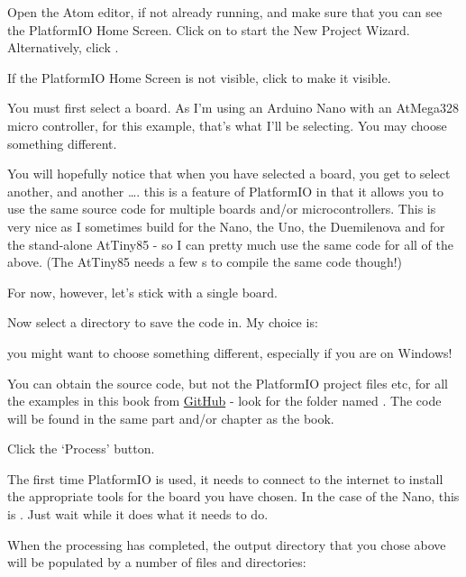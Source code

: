 Open the Atom editor, if not already running, and make sure that you can see the PlatformIO Home Screen. Click on  to start the New Project Wizard. Alternatively, click .

If the PlatformIO Home Screen is not visible, click  to make it visible.

You must first select a board. As I'm using an Arduino Nano with an AtMega328 micro controller, for this example, that's what I'll be selecting. You may choose something different.

You will hopefully notice that when you have selected a board, you get to select another, and another \ldots{}. this is a feature of PlatformIO in that it allows you to use the same source code for multiple boards and/or microcontrollers. This is very nice as I sometimes build for the Nano, the Uno, the Duemilenova and for the stand-alone AtTiny85 - so I can pretty much use the same code for all of the above. (The AtTiny85 needs a few s to compile the same code though!)

For now, however, let's stick with a single board.

Now select a directory to save the code in. My choice is:


you might want to choose something different, especially if you are on
Windows!

\begin{note}
You can obtain the source code, but not the PlatformIO project files etc, for all the examples in this book from \href{https://github.com/NormanDunbar/AVRBook}{GitHub} - look for the folder named . The code will be found in the same part and/or chapter as the book.
\end{note}

Click the `Process' button.

The first time PlatformIO is used, it needs to connect to the internet
to install the appropriate tools for the board you have chosen. In the
case of the Nano, this is . Just wait while it does what it needs to do.

When the processing has completed, the output directory that you chose
above will be populated by a number of files and directories:

